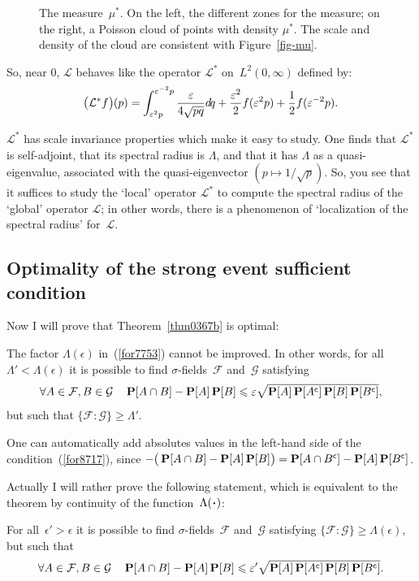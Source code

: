 \begin{Rmk}
\begin{figure}
\begin{tikzpicture}[x=5.25cm, y=5.25cm, line cap=round, >=stealth]
\end{tikzpicture}
%
\caption{The measure~$\mu^*$. On the left, the different zones for the measure;
on the right, a Poisson cloud of points with density $\mu^*$.
The scale and density of the cloud are consistent with Figure~\ref{fig-mu}.}%
\label{fig-mustar}
%
\end{figure}
%
So, near $0$, $\mathcal{L}$ behaves like the operator $\mathcal{L}^*$ on~$L^2(0,\infty)$
defined by:
\[\label{fo4259}
\big(\mathcal{L}^*f\big)(p) = \int_{\epsilon^2p}^{\epsilon^{-2}p} \frac{\epsilon}{4\sqrt{pq}} \dx{q}
+ \frac{\epsilon^2}{2} f(\epsilon^2p) + \frac{1}{2} f(\epsilon^{-2}p) .\]

$\mathcal{L}^*$ has scale invariance properties which make it easy to study.
One finds that $\mathcal{L}^*$ is self-adjoint,
that its spectral radius is $\Lambda$,
and that it has $\Lambda$ as a quasi-eigenvalue, associated with the quasi-eigenvector
$(p\mapsto1/\sqrt{p})$.
So, you see that it suffices to study the `local' operator $\mathcal{L}^*$
to compute the spectral radius of the `global' operator $\mathcal{L}$;
in other words, there is a phenomenon of `localization of the spectral radius'
for~$\mathcal{L}$.
\end{Rmk}


\subsection{Optimality of the strong event sufficient condition}%
\label{parOptimalityOfTheStrongEventSufficientCondition}

Now I will prove that Theorem~\ref{thm0367b} is optimal:
%
\begin{Thm}\label{pro1616}
The factor $\Lambda(\epsilon)$ in~(\ref{for7753}) cannot be improved.
In other words, for all~$\Lambda'<\Lambda(\epsilon)$ it is possible to find
$\sigma$-fields~$\mathcal{F}$ and~$\mathcal{G}$ satisfying
\[\label{for8717}
\forall A \in \mathcal{F}, B \in \mathcal{G} \quad \Pr[A\cap B] - \Pr[A]\Pr[B] \leq \epsilon \sqrt{\Pr[A]\Pr[\C{A}]\Pr[B]\Pr[\C{B}]}, \]
but such that $\{\mathcal{F}:\mathcal{G}\} \geq \Lambda'$.
\end{Thm}
%
\begin{Rmk}
One can automatically add absolutes values
in the left-hand side of the condition~(\ref{for8717}),
since $-\big(\Pr[A\cap B] - \Pr[A]\Pr[B]\big) = \Pr[A\cap \C{B}] - \Pr[A]\Pr[\C{B}]$.
\end{Rmk}

Actually I will rather prove the following statement,
which is equivalent to the theorem by continuity of the function~$\Lambda(\Bcdot)$:
\begin{Clm}
For all~$\epsilon'>\epsilon$ it is possible to find $\sigma$-fields~$\mathcal{F}$ and~$\mathcal{G}$
satisfying $\{\mathcal{F}:\mathcal{G}\} \geq \Lambda(\epsilon)$, but such that
\[\label{for8717b}
\forall A \in \mathcal{F}, B \in \mathcal{G} \quad \Pr[A\cap B] - \Pr[A]\Pr[B] \leq \epsilon' \sqrt{\Pr[A]\Pr[\C{A}]\Pr[B]\Pr[\C{B}]} .\]
\end{Clm}

